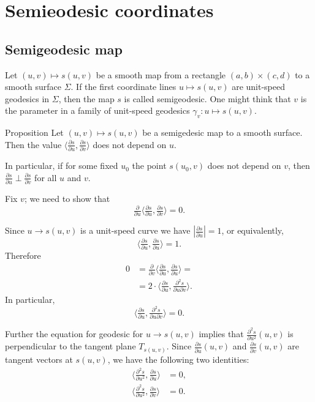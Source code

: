 \chapter{Semieodesic coordinates}

\section*{Semigeodesic map}

Let $(u,v)\mapsto s(u,v)$ be a smooth map from a rectangle $(a,b)\times(c,d)$ to a smooth surface $\Sigma$.
If the first coordinate lines $u\mapsto s(u,v)$ are unit-speed geodesics in $\Sigma$, then the map $s$ is called semigeodesic.
One might think that $v$ is the parameter in a family of unit-speed geodesics $\gamma_v:u\mapsto s(u,v)$.

\begin{thm}{Proposition}\label{prop:semigeodesic}
Let $(u,v)\mapsto s(u,v)$ be a semigedesic map to a smooth surface.
Then the value $\langle\tfrac{\partial s}{\partial u},\tfrac{\partial s}{\partial v}\rangle$ does not depend on $u$.

In particular,
if for some fixed $u_0$ the point $s(u_0,v)$ does not depend on $v$, 
then $\tfrac{\partial s}{\partial u}\perp \tfrac{\partial s}{\partial v}$ for all $u$ and $v$.

\end{thm}

Fix $v$; we need to show that 
\[\tfrac{\partial}{\partial u}\langle\tfrac{\partial s}{\partial u},\tfrac{\partial s}{\partial v}\rangle=0.\]

Since $u\to s(u,v)$ is a unit-speed curve we have $|\tfrac{\partial s}{\partial u}|=1$,
or equivalently,
\[\langle\tfrac{\partial s}{\partial u},\tfrac{\partial s}{\partial u}\rangle=1.\]
Therefore
\begin{align*}
0
&=\tfrac{\partial}{\partial v}\langle\tfrac{\partial s}{\partial u},\tfrac{\partial s}{\partial u}\rangle=
\\
&=2\cdot\langle\tfrac{\partial s}{\partial u},\tfrac{\partial^2 s}{\partial u\partial v}\rangle.
\end{align*}
In particular,
\[\langle\tfrac{\partial s}{\partial u},\tfrac{\partial^2 s}{\partial u\partial v}\rangle=0.\]

Further the equation for geodesic for $u\to s(u,v)$ implies that $\tfrac{\partial^2 s}{\partial u^2}(u,v)$ is perpendicular to the tangent plane $T_{s(u,v)}$.
Since $\tfrac{\partial s}{\partial u}(u,v)$ and $\tfrac{\partial s}{\partial v}(u,v)$ are tangent vectors at $s(u,v)$, we have the following two identities:
\begin{align*}
\langle\tfrac{\partial^2 s}{\partial u^2},\tfrac{\partial s}{\partial u}\rangle&=0,
\\
\langle\tfrac{\partial^2 s}{\partial u^2},\tfrac{\partial s}{\partial v}\rangle&=0.
\end{align*}

